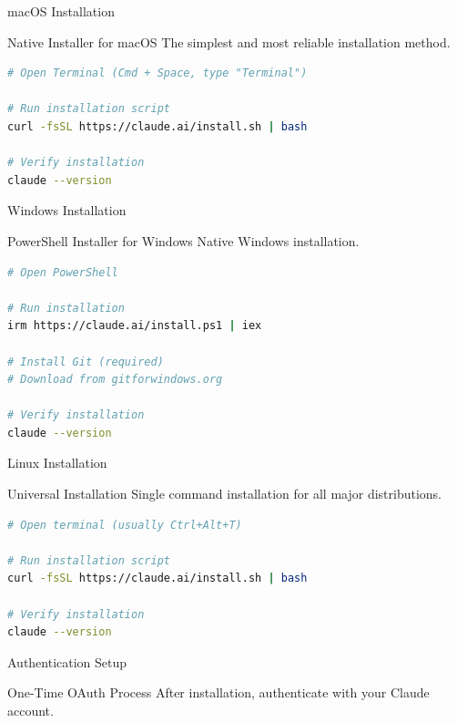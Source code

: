 \documentclass[10pt]{beamer}
\begin{document}
{\small	\begin{frame}[fragile]{macOS Installation}
		\begin{exampleblock}{Native Installer for macOS}
			The simplest and most reliable installation method.
		\end{exampleblock}
		
\begin{lstlisting}[language=bash]
# Open Terminal (Cmd + Space, type "Terminal")

# Run installation script
curl -fsSL https://claude.ai/install.sh | bash

# Verify installation
claude --version
\end{lstlisting}
		
		\vspace{0.3cm}
	\end{frame}
	
	\begin{frame}[fragile]{Windows Installation}
		\begin{exampleblock}{PowerShell Installer for Windows}
			Native Windows installation.
		\end{exampleblock}
		
\begin{lstlisting}[language=bash]
# Open PowerShell

# Run installation
irm https://claude.ai/install.ps1 | iex

# Install Git (required)
# Download from gitforwindows.org

# Verify installation
claude --version
\end{lstlisting}
		

	\end{frame}
	

	\begin{frame}[fragile]{Linux Installation}
		\begin{exampleblock}{Universal Installation}
			Single command installation for all major distributions.
		\end{exampleblock}

		
\begin{lstlisting}[language=bash]
# Open terminal (usually Ctrl+Alt+T)

# Run installation script
curl -fsSL https://claude.ai/install.sh | bash

# Verify installation
claude --version
\end{lstlisting}
	\end{frame}

	\begin{frame}[fragile]{Authentication Setup}
		\footnotesize
		\begin{block}{One-Time OAuth Process}
			After installation, authenticate with your Claude account.
		\end{block}
		

\end{frame}}
\end{document}
